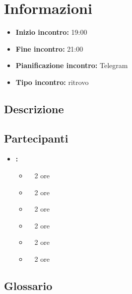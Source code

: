 \section{Informazioni}
\begin{itemize}
	\item \textbf{Inizio incontro:} 19:00
	\item \textbf{Fine incontro:} 21:00
	\item \textbf{Pianificazione incontro:} Telegram
	\item \textbf{Tipo incontro:} ritrovo
\end{itemize}

\subsection{Descrizione}
\DocDescription

\subsection{Partecipanti}

\begin{itemize}
	\item \textbf{\GroupName:}
	\begin{itemize}
		\item \tommaso \ \rightarrow\ 2 ore
		\item \marco \ \rightarrow\ 2 ore
		\item \riccardo \ \rightarrow\ 2 ore
		\item \raul \ \rightarrow\ 2 ore
		\item \martina \ \rightarrow\ 2 ore
		\item \sebastiano \ \rightarrow\ 2 ore
	\end{itemize}
\end{itemize}

\subsection{Glossario}
\GlossarioIntroduzione

\clearpage